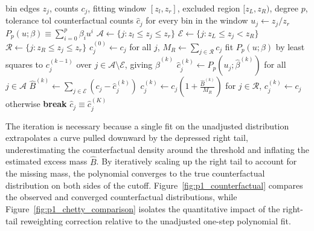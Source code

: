 \begin{algorithm}[H]
\caption{Iterative estimation of the counterfactual density with Chetty et al. (2011) reweighting}
\label{alg:p1_iter}
\begingroup
\renewcommand{\baselinestretch}{1.25}\selectfont
\begin{algorithmic}[1]
\Require bin edges $z_j$, counts $c_j$, fitting window $[z_l, z_r]$, excluded region $[z_L, z_R)$, degree $p$, tolerance $\text{tol}$
\Ensure counterfactual counts $\hat{c}_j$ for every bin in the window
\State $u_j \gets z_j / z_r$ 
\State $P_p(u; \beta) \equiv \sum_{i=0}^{p} \beta_i u^i$ 
\State $\mathcal{A} \gets \{j : z_l \le z_j \le z_r\}$ 
\State $\mathcal{E} \gets \{j : z_L \le z_j < z_R\}$ 
\State $\mathcal{R} \gets \{j : z_R \le z_j \le z_r\}$ 
\State $c^{(0)}_j \gets c_j$ for all $j$, \quad $M_R \gets \sum_{j \in \mathcal{R}} c_j$ 
    \State fit $P_p(u;\beta)$ by least squares to $c^{(k-1)}_j$ over $j \in \mathcal{A} \setminus \mathcal{E}$, giving $\hat{\beta}^{(k)}$ 
    \State $\hat{c}^{(k)}_j \gets P_p(u_j;\hat{\beta}^{(k)})$ \quad for all $j \in \mathcal{A}$ 
    \State $\hat{B}^{(k)} \gets \sum_{j \in \mathcal{E}} \left( c_j - \hat{c}^{(k)}_j \right)$ 
    \State $c^{(k)}_j \gets c_j \left(1 + \frac{\hat{B}^{(k)}}{M_R}\right)$ for $j \in \mathcal{R}$, \quad $c^{(k)}_j \gets c_j$ otherwise 
        \State \textbf{break}
    \EndIf
\EndFor
\State \Return $\hat{c}_j \equiv \hat{c}^{(K)}_j$ 
\end{algorithmic}
\endgroup
\end{algorithm}

The iteration is necessary because a single fit on the unadjusted distribution extrapolates a curve pulled downward by the depressed right tail, underestimating the counterfactual density around the threshold and inflating the estimated excess mass $\hat{B}$. By iteratively scaling up the right tail to account for the missing mass, the polynomial converges to the true counterfactual distribution on both sides of the cutoff. Figure~\ref{fig:p1_counterfactual} compares the observed and converged counterfactual distributions, while Figure~\ref{fig:p1_chetty_comparison} isolates the quantitative impact of the right-tail reweighting correction relative to the unadjusted one-step polynomial fit.

